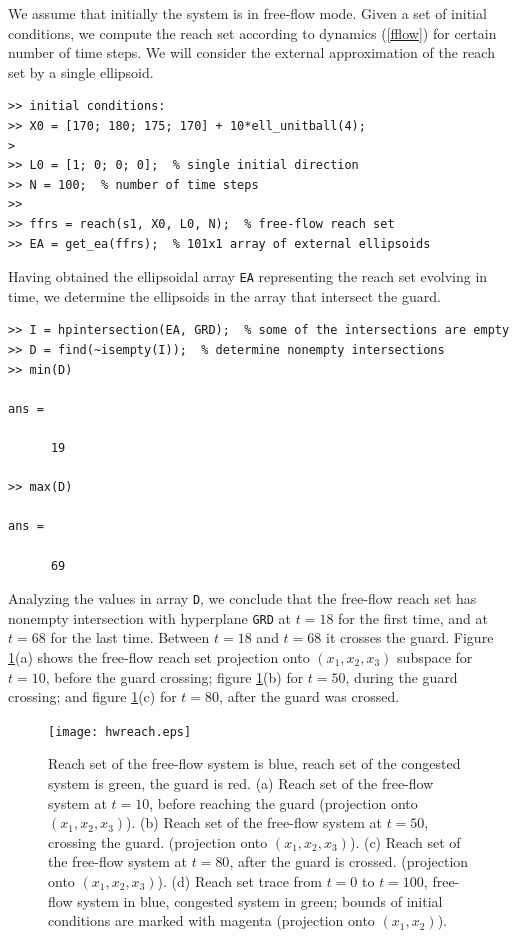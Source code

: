 \documentclass{report}
\begin{document}
We assume that initially the system is in free-flow mode.
Given a set of initial conditions, we  compute the reach set according
to dynamics (\ref{fflow}) for certain number of time steps.
We will consider the external approximation of the reach set by a single
ellipsoid.
{\tt \begin{verbatim}
>> initial conditions:
>> X0 = [170; 180; 175; 170] + 10*ell_unitball(4);
>
>> L0 = [1; 0; 0; 0];  % single initial direction
>> N = 100;  % number of time steps
>>
>> ffrs = reach(s1, X0, L0, N);  % free-flow reach set
>> EA = get_ea(ffrs);  % 101x1 array of external ellipsoids
\end{verbatim}}
Having obtained the ellipsoidal array {\tt EA} representing the reach set
evolving in time, we  determine the  ellipsoids in the array that
intersect the guard.
{\tt \begin{verbatim}
>> I = hpintersection(EA, GRD);  % some of the intersections are empty
>> D = find(~isempty(I));  % determine nonempty intersections
>> min(D)

ans =

      19

>> max(D)

ans =

      69
\end{verbatim}}
Analyzing the values in array {\tt D}, we conclude that the free-flow reach set
has nonempty intersection with hyperplane {\tt GRD} at $t=18$
for the first time, and at $t=68$ for the last time.
Between $t=18$ and
$t=68$ it crosses the guard. Figure \ref{hwreachfig}(a) shows the
free-flow reach set projection onto $(x_1,x_2,x_3)$ subspace for $t=10$,
before the guard crossing; figure \ref{hwreachfig}(b) for $t=50$,
during the guard crossing; and figure \ref{hwreachfig}(c) for $t=80$,
after the guard was crossed.
\begin{figure}[htbp]
\centerline{
\texttt{[image: hwreach.eps]}}
\caption{Reach set of the free-flow system is blue, reach set of the congested
system is green, the guard is red.
\newline
(a) Reach set of the free-flow system at $t = 10$, before reaching the guard
(projection onto $(x_1,x_2,x_3)$).
\newline
(b) Reach set of the free-flow system at $t = 50$, crossing the guard.
(projection onto $(x_1,x_2,x_3)$).
\newline
(c) Reach set of the free-flow system at $t = 80$, after the guard is crossed.
(projection onto $(x_1,x_2,x_3)$).
\newline
(d) Reach set trace from $t=0$ to $t=100$, free-flow system in blue,
congested system in green; bounds of initial conditions are marked with magenta
(projection onto $(x_1,x_2)$).  }
\label{hwreachfig}
\end{figure}
\end{document}
